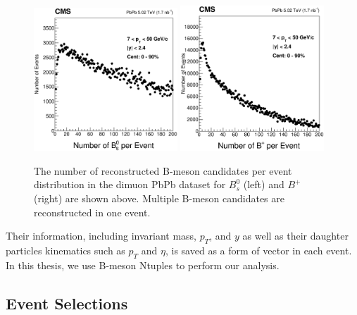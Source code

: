 \begin{figure}[h]
\begin{center}
\includegraphics[width= 0.48\textwidth]{Figures/Chapter5/BsSize.eps}
\includegraphics[width= 0.48\textwidth]{Figures/Chapter5/BPSize.eps}
\caption{The number of reconstructed B-meson candidates per event distribution in the dimuon PbPb dataset for $B^0_s$ (left) and $B^+$ (right) are shown above. Multiple B-meson candidates are reconstructed in one event.}
\label{BCand}
\end{center}
\end{figure}


Their information, including invariant mass, $p_T$, and $y$ as well as their daughter particles kinematics such as $p_T$ and $\eta$, is saved as a form of vector in each event. In this thesis, we use B-meson Ntuples to perform our analysis.




\subsection{Event Selections}

